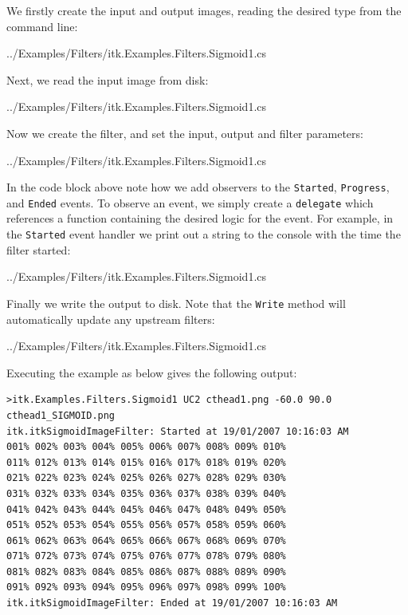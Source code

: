 \documentclass{InsightArticle}
\def\code#1{\texttt{#1}}
\begin{document}
We firstly create the input and output images, reading the desired type from the 
command line:
\begin{center}
	
	{../Examples/Filters/itk.Examples.Filters.Sigmoid1.cs}
\end{center}

Next, we read the input image from disk:
\begin{center}
	
	{../Examples/Filters/itk.Examples.Filters.Sigmoid1.cs}
\end{center}

Now we create the filter, and set the input, output and filter parameters:
\begin{center}
	
	{../Examples/Filters/itk.Examples.Filters.Sigmoid1.cs}
\end{center}

In the code block above note how we add observers to the 
\code{Started}, \code{Progress}, and \code{Ended} events.
To observe an event, we simply create a \code{delegate}
which references a function containing the desired logic
for the event. For example, in the \code{Started} event
handler we print out a string to the console with the
time the filter started:
\begin{center}
	
	{../Examples/Filters/itk.Examples.Filters.Sigmoid1.cs}
\end{center}

Finally we write the output to disk. Note that the \code{Write}
method will automatically update any upstream filters:
\begin{center}
	
	{../Examples/Filters/itk.Examples.Filters.Sigmoid1.cs}
\end{center}

Executing the example as below gives the following output:
\begin{lstlisting}
>itk.Examples.Filters.Sigmoid1 UC2 cthead1.png -60.0 90.0 cthead1_SIGMOID.png
itk.itkSigmoidImageFilter: Started at 19/01/2007 10:16:03 AM
001% 002% 003% 004% 005% 006% 007% 008% 009% 010%
011% 012% 013% 014% 015% 016% 017% 018% 019% 020%
021% 022% 023% 024% 025% 026% 027% 028% 029% 030%
031% 032% 033% 034% 035% 036% 037% 038% 039% 040%
041% 042% 043% 044% 045% 046% 047% 048% 049% 050%
051% 052% 053% 054% 055% 056% 057% 058% 059% 060%
061% 062% 063% 064% 065% 066% 067% 068% 069% 070%
071% 072% 073% 074% 075% 076% 077% 078% 079% 080%
081% 082% 083% 084% 085% 086% 087% 088% 089% 090%
091% 092% 093% 094% 095% 096% 097% 098% 099% 100%
itk.itkSigmoidImageFilter: Ended at 19/01/2007 10:16:03 AM
\end{lstlisting}
\end{document}

